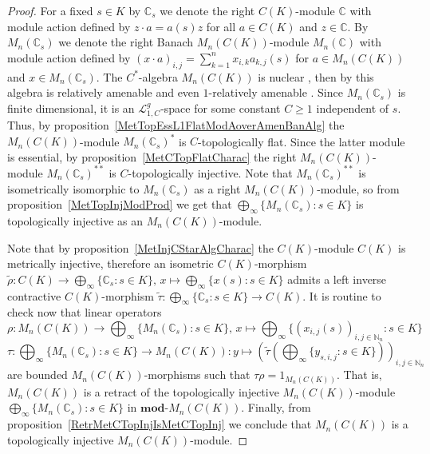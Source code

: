\begin{proof} For a fixed $s\in K$ by $\mathbb{C}_s$ we denote the right
$C(K)$-module $\mathbb{C}$ with module action defined by $z\cdot a=a(s)z$ for all
$a\in C(K)$ and $z\in\mathbb{C}$. By $M_n(\mathbb{C}_s)$ we denote the right
Banach $M_n(C(K))$-module $M_n(\mathbb{C})$ with module action defined by
${(x\cdot a)}_{i,j}=\sum_{k=1}^n x_{i,k}a_{k,j}(s)$ for $a\in M_n(C(K))$ and 
$x\in M_n(\mathbb{C}_s)$. The $C^*$-algebra $M_n(C(K))$ is nuclear
\cite[corollary 2.4.4]{BroOzaCStarAlgFinDimApprox}, then by
\cite[theorem 3.1]{HaaNucCStarAlgAmen} this algebra is relatively amenable and
even $1$-relatively amenable \cite[example 2]{RundeAmenConstFour}. Since
$M_n(\mathbb{C}_s)$ is finite dimensional, it is an $\mathscr{L}_{1, C}^g$-space
for some constant $C\geq 1$ independent of $s$. Thus, by
proposition~\ref{MetTopEssL1FlatModAoverAmenBanAlg} the $M_n(C(K))$-module
${M_n(\mathbb{C}_s)}^*$ is $C$-topologically flat. Since the latter module is
essential, by proposition~\ref{MetCTopFlatCharac} the right $M_n(C(K))$-module
${M_n(\mathbb{C}_s)}^{**}$ is $C$-topologically injective. Note that
${M_n(\mathbb{C}_s)}^{**}$ is isometrically isomorphic to $M_n(\mathbb{C}_s)$ as a 
right $M_n(C(K))$-module, so from proposition~\ref{MetTopInjModProd} we get that
$\bigoplus_\infty \{M_n(\mathbb{C}_s):s\in K \}$ is topologically injective as an
$M_n(C(K))$-module.

Note that by proposition~\ref{MetInjCStarAlgCharac} the $C(K)$-module $C(K)$ is
metrically injective, therefore an isometric $C(K)$-morphism
$\widetilde{\rho}:
C(K)\to\bigoplus_\infty \{ \mathbb{C}_s:s\in K \},\, 
x\mapsto \bigoplus_\infty \{x(s):s\in K \}$ 
admits a left inverse contractive $C(K)$-morphism 
$\widetilde{\tau}:\bigoplus_\infty \{ \mathbb{C}_s:s\in K \} \to C(K)$. 
It is routine to check now that linear operators
\[
\rho:
M_n(C(K))\to\bigoplus\nolimits_\infty \{M_n(\mathbb{C}_s):s\in K \},\, 
x\mapsto \bigoplus\nolimits_\infty \{
    {(x_{i,j}(s))}_{i,j\in\mathbb{N}_n}:s\in K
 \}
\]
\[
\tau
:\bigoplus\nolimits_\infty \{M_n(\mathbb{C}_s):s\in K \}\to M_n(C(K))
:y\mapsto {\left(
    \widetilde{\tau}\left(\bigoplus\nolimits_\infty \{y_{s,i,j}:s\in K \}\right)
\right)}_{i,j\in\mathbb{N}_n}
\]
are bounded $M_n(C(K))$-morphisms such that $\tau \rho=1_{M_n(C(K))}$. That is,
$M_n(C(K))$ is a retract of the topologically injective $M_n(C(K))$-module
$\bigoplus_\infty \{M_n(\mathbb{C}_s):s\in K \}$ in $\mathbf{mod}\text{-}M_n(C(K))$.
Finally, from proposition~\ref{RetrMetCTopInjIsMetCTopInj} we conclude that
$M_n(C(K))$ is a topologically injective $M_n(C(K))$-module.
\end{proof}


